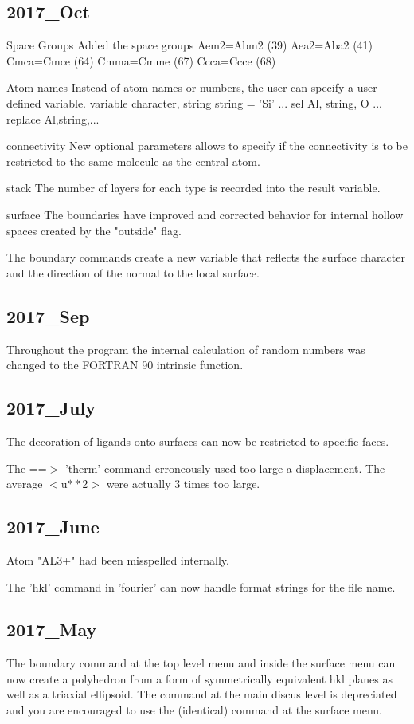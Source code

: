 \subsection*{2017\_Oct}
\par
Space Groups 
  Added the space groups 
  Aem2=Abm2 (39) 
  Aea2=Aba2 (41) 
  Cmca=Cmce (64) 
  Cmma=Cmme (67) 
  Ccca=Ccce (68) 
\par
Atom names 
  Instead of atom names or numbers, the user can specify a 
  user defined variable. 
  variable character, string 
  string = 'Si' 
  ... 
  sel  Al, string, O 
  ... 
  replace Al,string,... 
\par
connectivity 
  New optional parameters allows to specify if the connectivity is to 
  be restricted to the same molecule as the central atom. 
\par
stack 
  The number of layers for each type is recorded into 
  the result variable. 
\par
surface 
  The boundaries have improved and corrected behavior for internal 
  hollow spaces created by the "outside" flag. 
\par
  The boundary commands create a new variable that reflects the 
  surface character and the direction of the normal to the local 
  surface. 
\subsection*{2017\_Sep}
\par
Throughout the program the internal calculation of random numbers 
was changed to the FORTRAN 90 intrinsic function. 
\subsection*{2017\_July}
\par
The decoration of ligands onto surfaces can now be restricted to 
specific faces. 
\par
The ==$> $ 'therm' command erroneously used too large a displacement. 
The average $ <$u$**$2$> $ were actually 3 times too large. 
\subsection*{2017\_June}
\par
Atom "AL3+" had been misspelled internally. 
\par
The 'hkl' command in 'fourier' can now handle format strings for 
the file name. 
\subsection*{2017\_May}
\par
The boundary command at the top level menu and inside the surface 
menu can now create a polyhedron from a form of symmetrically 
equivalent hkl planes as well as a triaxial ellipsoid. 
The command at the main discus level is depreciated and you are 
encouraged to use the (identical) command at the surface menu. 
